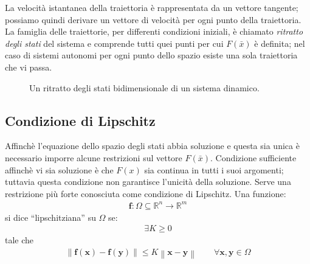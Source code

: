 \newpage

La velocità istantanea della traiettoria è rappresentata da un vettore tangente; possiamo quindi derivare un vettore di velocità per ogni punto della traiettoria.
La famiglia delle traiettorie, per differenti condizioni iniziali, è chiamato \emph{ritratto degli stati} del sistema e comprende tutti quei punti per cui $F(\bar{x})$ è definita; nel caso di sistemi autonomi per ogni punto dello spazio esiste una sola traiettoria che vi passa.

\begin{figure}[h!]
	\centering
	\caption{Un ritratto degli stati bidimensionale di un sistema dinamico.}
\end{figure}

\subsection{Condizione di Lipschitz} %
\label{sub:condizione_di_lischitz}
Affinchè l’equazione dello spazio degli stati abbia soluzione e questa sia unica è necessario imporre alcune restrizioni sul vettore $F(\bar{x})$. Condizione sufficiente affinchè vi sia soluzione è che $F(x)$ sia continua in tutti i suoi argomenti; tuttavia questa condizione non garantisce l’unicità della soluzione. Serve una restrizione più forte conosciuta come condizione di Lipschitz. Una funzione:
\begin{align*}
    \mathbf{f}: \Omega \subseteq \mathbb{R}^n \rightarrow \mathbb{R}^m
\end{align*}
si dice “lipschitziana” su $\Omega$ se:
\begin{align*}
    \exists K \ge 0 
\end{align*}
tale che 
\begin{align*}
    \left \| \mathbf{f}(\mathbf{x}) - \mathbf{f}(\mathbf{y}) \right \| \le K \left \| \mathbf{x} - \mathbf{y} \right \| \qquad \forall \mathbf{x}, \mathbf{y} \in \Omega 
\end{align*}

